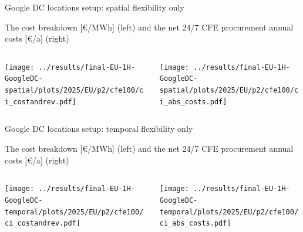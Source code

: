 \begin{frame}{Google DC locations setup: spatial flexibility only}

  \centering

  {\footnotesize
  The cost breakdown [\euro/MWh] (left) and the net 24/7 CFE procurement annual costs [\euro/a] (right)
  }
  \vspace{.5cm}
  
  \begin{columns}
    \begin{column}{8cm}
    \centering
    \texttt{[image: ../results/final-EU-1H-GoogleDC-spatial/plots/2025/EU/p2/cfe100/ci\_costandrev.pdf]}
    \end{column}
    
    \begin{column}{8cm}
      \centering
      \texttt{[image: ../results/final-EU-1H-GoogleDC-spatial/plots/2025/EU/p2/cfe100/ci\_abs\_costs.pdf]}
      \end{column}
    \end{columns}

\end{frame}


\begin{frame}{Google DC locations setup: temporal flexibility only}

  \centering

  {\footnotesize
  The cost breakdown [\euro/MWh] (left) and the net 24/7 CFE procurement annual costs [\euro/a] (right)
  }
  \vspace{.5cm}
  
  \begin{columns}
    \begin{column}{8cm}
    \centering
    \texttt{[image: ../results/final-EU-1H-GoogleDC-temporal/plots/2025/EU/p2/cfe100/ci\_costandrev.pdf]}
    \end{column}
    
    \begin{column}{8cm}
      \centering
      \texttt{[image: ../results/final-EU-1H-GoogleDC-temporal/plots/2025/EU/p2/cfe100/ci\_abs\_costs.pdf]}
      \end{column}
    \end{columns}

\end{frame}


